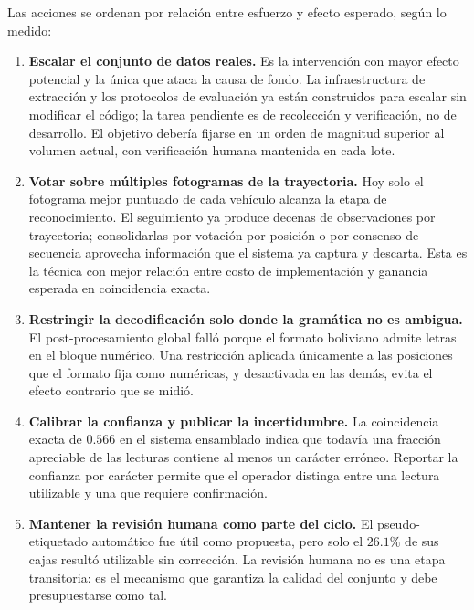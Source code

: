 Las acciones se ordenan por relación entre esfuerzo y efecto esperado, según lo
medido:

\begin{enumerate}
    \item \textbf{Escalar el conjunto de datos reales.} Es la intervención con
        mayor efecto potencial y la única que ataca la causa de fondo. La
        infraestructura de extracción y los protocolos de evaluación ya están
        construidos para escalar sin modificar el código; la tarea pendiente es
        de recolección y verificación, no de desarrollo. El objetivo debería
        fijarse en un orden de magnitud superior al volumen actual, con
        verificación humana mantenida en cada lote.

    \item \textbf{Votar sobre múltiples fotogramas de la trayectoria.} Hoy solo
        el fotograma mejor puntuado de cada vehículo alcanza la etapa de
        reconocimiento. El seguimiento ya produce decenas de observaciones por
        trayectoria; consolidarlas por votación por posición o por consenso de
        secuencia aprovecha información que el sistema ya captura y descarta.
        Esta es la técnica con mejor relación entre costo de implementación y
        ganancia esperada en coincidencia exacta.

    \item \textbf{Restringir la decodificación solo donde la gramática no es
        ambigua.} El post-procesamiento global falló porque el formato boliviano
        admite letras en el bloque numérico. Una restricción aplicada únicamente
        a las posiciones que el formato fija como numéricas, y desactivada en las
        demás, evita el efecto contrario que se midió.

    \item \textbf{Calibrar la confianza y publicar la incertidumbre.} La
        coincidencia exacta de $0{.}566$ en el sistema ensamblado indica que
        todavía una fracción apreciable de las lecturas contiene al menos un
        carácter erróneo. Reportar la confianza por carácter permite que el
        operador distinga entre una lectura utilizable y una que requiere
        confirmación.

    \item \textbf{Mantener la revisión humana como parte del ciclo.} El
        pseudo-etiquetado automático fue útil como propuesta, pero solo el
        $26{.}1\%$ de sus cajas resultó utilizable sin corrección. La revisión
        humana no es una etapa transitoria: es el mecanismo que garantiza la
        calidad del conjunto y debe presupuestarse como tal.
\end{enumerate}


